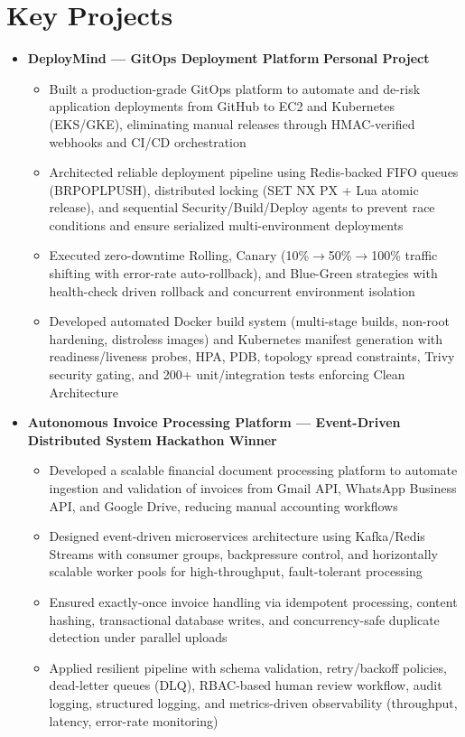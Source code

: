 \documentclass[letterpaper,10pt]{article}
\newcommand{\resumeItem}[1]{\item \small{#1}}
\newcommand{\resumeProjectHeading}[2]{
\item
\small #1 \hfill \textbf{\small #2}
\vspace{-4pt}
}
\begin{document}
\vspace{-6pt}
\section{Key Projects}
\begin{itemize}[leftmargin=0in, label={}]

\resumeProjectHeading
{\textbf{DeployMind — GitOps Deployment Platform}}{Personal Project}
\begin{itemize}
\resumeItem{Built a production-grade GitOps platform to automate and de-risk application deployments from GitHub to EC2 and Kubernetes (EKS/GKE), eliminating manual releases through HMAC-verified webhooks and CI/CD orchestration}
\resumeItem{Architected reliable deployment pipeline using Redis-backed FIFO queues (BRPOPLPUSH), distributed locking (SET NX PX + Lua atomic release), and sequential Security/Build/Deploy agents to prevent race conditions and ensure serialized multi-environment deployments}
\resumeItem{Executed zero-downtime Rolling, Canary (10\%$\rightarrow$50\%$\rightarrow$100\% traffic shifting with error-rate auto-rollback), and Blue-Green strategies with health-check driven rollback and concurrent environment isolation}
\resumeItem{Developed automated Docker build system (multi-stage builds, non-root hardening, distroless images) and Kubernetes manifest generation with readiness/liveness probes, HPA, PDB, topology spread constraints, Trivy security gating, and 200+ unit/integration tests enforcing Clean Architecture}
\end{itemize}

\resumeProjectHeading
{\textbf{Autonomous Invoice Processing Platform — Event-Driven Distributed System}}{Hackathon Winner}
\begin{itemize}
\resumeItem{Developed a scalable financial document processing platform to automate ingestion and validation of invoices from Gmail API, WhatsApp Business API, and Google Drive, reducing manual accounting workflows}
\resumeItem{Designed event-driven microservices architecture using Kafka/Redis Streams with consumer groups, backpressure control, and horizontally scalable worker pools for high-throughput, fault-tolerant processing}
\resumeItem{Ensured exactly-once invoice handling via idempotent processing, content hashing, transactional database writes, and concurrency-safe duplicate detection under parallel uploads}
\resumeItem{Applied resilient pipeline with schema validation, retry/backoff policies, dead-letter queues (DLQ), RBAC-based human review workflow, audit logging, structured logging, and metrics-driven observability (throughput, latency, error-rate monitoring)}
\end{itemize}


\end{itemize}
\end{document}
